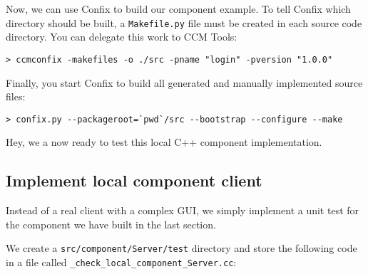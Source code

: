 Now, we can use Confix to build our component example. To tell Confix which
directory should be built, a {\tt Makefile.py} file must be created in each
source code directory.
You can delegate this work to CCM Tools:
\begin{verbatim}
> ccmconfix -makefiles -o ./src -pname "login" -pversion "1.0.0"
\end{verbatim}
 
Finally, you start Confix to build all generated and manually implemented source
files:
\begin{verbatim}
> confix.py --packageroot=`pwd`/src --bootstrap --configure --make 
\end{verbatim}

Hey, we a now ready to test this local C++ component implementation.


\subsection{Implement local component client}
\label{subsection:ImplementLocalComponentClient}

Instead of a real client with a complex GUI, we simply implement a unit test for
the component we have built in the last section.

\vspace{3mm}
We create a {\tt src/component/Server/test} directory and store the following
code in a file called {\tt \_check\_local\_component\_Server.cc}:
 
